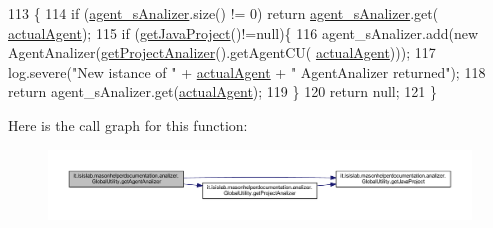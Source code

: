 \begin{DoxyCode}
113                                                    \{
114         \textcolor{keywordflow}{if} (\hyperlink{classit_1_1isislab_1_1masonhelperdocumentation_1_1analizer_1_1_global_utility_a82af8b91f98c70ad25d504cc16e424b9}{agent\_sAnalizer}.size() != 0) \textcolor{keywordflow}{return} \hyperlink{classit_1_1isislab_1_1masonhelperdocumentation_1_1analizer_1_1_global_utility_a82af8b91f98c70ad25d504cc16e424b9}{agent\_sAnalizer}.get(
      \hyperlink{classit_1_1isislab_1_1masonhelperdocumentation_1_1analizer_1_1_global_utility_a8106b6699b9c7834ead4fc38d62a2575}{actualAgent});
115         \textcolor{keywordflow}{if} (\hyperlink{classit_1_1isislab_1_1masonhelperdocumentation_1_1analizer_1_1_global_utility_a1ce214dc72551ff78133933c461d4e59}{getJavaProject}()!=null)\{
116             agent\_sAnalizer.add(\textcolor{keyword}{new} AgentAnalizer(\hyperlink{classit_1_1isislab_1_1masonhelperdocumentation_1_1analizer_1_1_global_utility_af6bcca0c06ec6fa8c2b2b88f5050914c}{getProjectAnalizer}().getAgentCU(
      \hyperlink{classit_1_1isislab_1_1masonhelperdocumentation_1_1analizer_1_1_global_utility_a8106b6699b9c7834ead4fc38d62a2575}{actualAgent})));
117             log.severe(\textcolor{stringliteral}{"New istance of "} + \hyperlink{classit_1_1isislab_1_1masonhelperdocumentation_1_1analizer_1_1_global_utility_a8106b6699b9c7834ead4fc38d62a2575}{actualAgent} + \textcolor{stringliteral}{" AgentAnalizer returned"});
118             \textcolor{keywordflow}{return} agent\_sAnalizer.get(\hyperlink{classit_1_1isislab_1_1masonhelperdocumentation_1_1analizer_1_1_global_utility_a8106b6699b9c7834ead4fc38d62a2575}{actualAgent});
119         \}
120         \textcolor{keywordflow}{return} null;
121     \}
\end{DoxyCode}


Here is the call graph for this function\-:\nopagebreak
\begin{figure}[H]
\begin{center}
\leavevmode
\includegraphics[width=350pt]{classit_1_1isislab_1_1masonhelperdocumentation_1_1analizer_1_1_global_utility_a0853970ee6f3d2b617fc1dd5fcd172ce_cgraph}
\end{center}
\end{figure}




